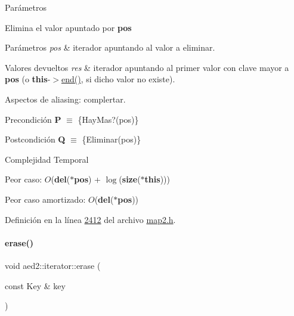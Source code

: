 \begin{DoxyParams}{\-Parámetros}
\begin{DoxyCompactItemize}
Elimina el valor apuntado por {\bfseries pos} 


\begin{DoxyParams}{Parámetros}
{\em pos} & iterador apuntando al valor a eliminar. \\
\hline
\end{DoxyParams}

\begin{DoxyRetVals}{Valores devueltos}
{\em res} & iterador apuntando al primer valor con clave mayor a {\bfseries pos} (o {\bfseries this}-\/$>$\hyperlink{classaed2_1_1iterator_a67caf9468be999e9be96b7add5d79946_a67caf9468be999e9be96b7add5d79946}{end()}, si dicho valor no existe).\\
\hline
\end{DoxyRetVals}
\begin{DoxyParagraph}{Aspectos de aliasing\+:}
complertar.
\end{DoxyParagraph}
\begin{DoxyPrecond}{Precondición}
{\bfseries P} $\equiv$ \{Hay\+Mas?(pos)\} 
\end{DoxyPrecond}
\begin{DoxyPostcond}{Postcondición}
{\bfseries Q} $\equiv$ \{Eliminar(pos)\}
\end{DoxyPostcond}

\begin{DoxyDescription}
\item[Complejidad Temporal]
\begin{DoxyItemize}
\item Peor caso\+: $O$({\bfseries del}({\bfseries $\ast$pos}) + $\log$({\bfseries size}({\bfseries $\ast$this})))
\item Peor caso amortizado\+: $O$({\bfseries del}({\bfseries $\ast$pos})) 
\end{DoxyItemize}
\end{DoxyDescription}

Definición en la línea \hyperlink{map2_8h_source_l02412}{2412} del archivo \hyperlink{map2_8h_source}{map2.\+h}.

\mbox{\label{classaed2_1_1iterator_a0a0e62b2a2c0fb98f431164c66a6e388_a0a0e62b2a2c0fb98f431164c66a6e388}} 
\paragraph{\texorpdfstring{erase()}{erase()}\hspace{0.1cm}{\footnotesize\ttfamily [2/2]}}
{\footnotesize\ttfamily void aed2\+::iterator\+::erase (\begin{DoxyParamCaption}\item[{const Key \&}]{key }\end{DoxyParamCaption})\hspace{0.3cm}{\ttfamily [inline]}}




\end{DoxyCompactItemize}
\end{DoxyParams}

